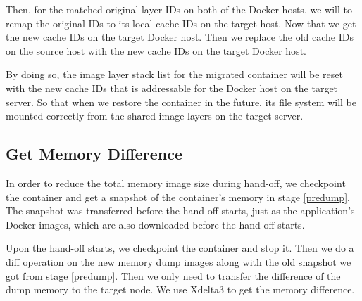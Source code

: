 Then, for the matched original layer IDs on both of the Docker hosts, we will to remap the original IDs to its local cache IDs on the target host. Now that we get the new cache IDs on the target Docker host. Then we replace the old cache IDs on the source host with the new cache IDs on the target Docker host.  

By doing so, the image layer stack list for the migrated container will be reset with the new cache IDs that is addressable for the Docker host on the target server. So that when we restore the container in the future, its file system will be mounted correctly from the shared image layers on the target server.






\subsection{Get Memory Difference} \label{design:memDiff}

In order to reduce the total memory image size during hand-off, we checkpoint the container and get a snapshot of the container's memory in stage \ref{predump}. The snapshot was transferred before the hand-off starts, just as the application's Docker images, which are also downloaded before the hand-off starts.

Upon the hand-off starts, we checkpoint the container and stop it. Then we do a diff operation on the new memory dump images along with the old snapshot we got from stage \ref{predump}. Then we only need to transfer the difference of the dump memory to the target node. We use Xdelta3 to get the memory difference.



